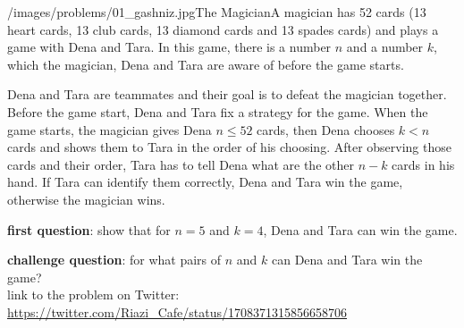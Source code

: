 \begin{problem}{/images/problems/01_gashniz.jpg}{The Magician}A magician has 52 cards (13 heart cards, 13 club cards, 13 diamond cards and 13 spades cards) and plays a game with Dena and Tara. In this game, there is a number $n$ and a number $k$, which the magician, Dena and Tara are aware of before the game starts.

Dena and Tara are teammates and their goal is to defeat the magician together.
Before the game start, Dena and Tara fix a strategy for the game. When the game starts, the magician gives Dena $n \leq 52$ cards, then Dena chooses $k < n$ cards and shows them to Tara in the order of his choosing. After observing those cards and their order, Tara has to tell Dena what are the other $n-k$ cards in his hand. If Tara can identify them correctly, Dena and Tara win the game, otherwise the magician wins.

\textbf{first question}: show that for $n=5$ and $k=4$, Dena and Tara can win the game.

\textbf{challenge question}: for what pairs of $n$ and $k$ can Dena and Tara win the game?\\[0.2cm]

link to the problem on Twitter:  \url{https://twitter.com/Riazi_Cafe/status/1708371315856658706}\end{problem}
